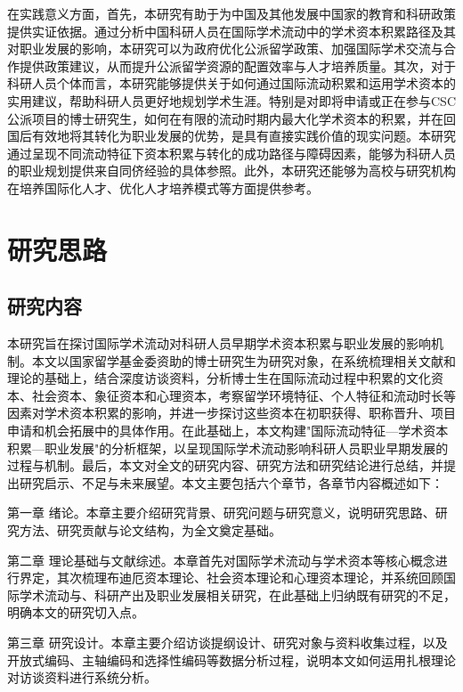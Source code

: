 在实践意义方面，首先，本研究有助于为中国及其他发展中国家的教育和科研政策提供实证依据。通过分析中国科研人员在国际学术流动中的学术资本积累路径及其对职业发展的影响，本研究可以为政府优化公派留学政策、加强国际学术交流与合作提供政策建议，从而提升公派留学资源的配置效率与人才培养质量。其次，对于科研人员个体而言，本研究能够提供关于如何通过国际流动积累和运用学术资本的实用建议，帮助科研人员更好地规划学术生涯。特别是对即将申请或正在参与CSC公派项目的博士研究生，如何在有限的流动时期内最大化学术资本的积累，并在回国后有效地将其转化为职业发展的优势，是具有直接实践价值的现实问题。本研究通过呈现不同流动特征下资本积累与转化的成功路径与障碍因素，能够为科研人员的职业规划提供来自同侪经验的具体参照。此外，本研究还能够为高校与研究机构在培养国际化人才、优化人才培养模式等方面提供参考。


\section{研究思路}

\subsection{研究内容}

本研究旨在探讨国际学术流动对科研人员早期学术资本积累与职业发展的影响机制。本文以国家留学基金委资助的博士研究生为研究对象，在系统梳理相关文献和理论的基础上，结合深度访谈资料，分析博士生在国际流动过程中积累的文化资本、社会资本、象征资本和心理资本，考察留学环境特征、个人特征和流动时长等因素对学术资本积累的影响，并进一步探讨这些资本在初职获得、职称晋升、项目申请和机会拓展中的具体作用。在此基础上，本文构建"国际流动特征---学术资本积累---职业发展"的分析框架，以呈现国际学术流动影响科研人员职业早期发展的过程与机制。最后，本文对全文的研究内容、研究方法和研究结论进行总结，并提出研究启示、不足与未来展望。本文主要包括六个章节，各章节内容概述如下：

第一章 绪论。本章主要介绍研究背景、研究问题与研究意义，说明研究思路、研究方法、研究贡献与论文结构，为全文奠定基础。

第二章 理论基础与文献综述。本章首先对国际学术流动与学术资本等核心概念进行界定，其次梳理布迪厄资本理论、社会资本理论和心理资本理论，并系统回顾国际学术流动与、科研产出及职业发展相关研究，在此基础上归纳既有研究的不足，明确本文的研究切入点。

第三章 研究设计。本章主要介绍访谈提纲设计、研究对象与资料收集过程，以及开放式编码、主轴编码和选择性编码等数据分析过程，说明本文如何运用扎根理论对访谈资料进行系统分析。

